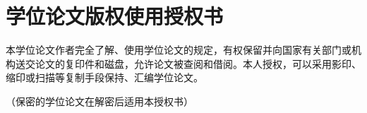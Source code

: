 
\chapter{学位论文版权使用授权书}
本学位论文作者完全了解、使用学位论文的规定，有权保留并向国家有关部门或机构送交论文的复印件和磁盘，允许论文被查阅和借阅。本人授权，可以采用影印、缩印或扫描等复制手段保持、汇编学位论文。


（保密的学位论文在解密后适用本授权书）
\vspace{4cm}
\autograph
